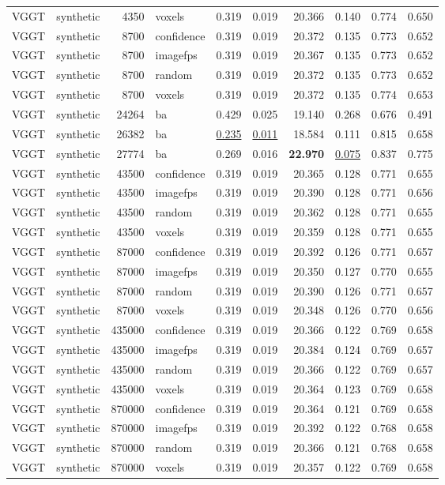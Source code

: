 \begin{table}[H]
\begin{tabular}{llrlrrrrrr}
VGGT & synthetic & 4350 & voxels & 0.319 & 0.019 & 20.366 & 0.140 & 0.774 & 0.650 \\
VGGT & synthetic & 8700 & confidence & 0.319 & 0.019 & 20.372 & 0.135 & 0.773 & 0.652 \\
VGGT & synthetic & 8700 & imagefps & 0.319 & 0.019 & 20.367 & 0.135 & 0.773 & 0.652 \\
VGGT & synthetic & 8700 & random & 0.319 & 0.019 & 20.372 & 0.135 & 0.773 & 0.652 \\
VGGT & synthetic & 8700 & voxels & 0.319 & 0.019 & 20.372 & 0.135 & 0.774 & 0.653 \\
VGGT & synthetic & 24264 & ba & 0.429 & 0.025 & 19.140 & 0.268 & 0.676 & 0.491 \\
VGGT & synthetic & 26382 & ba & \underline{0.235} & \underline{0.011} & 18.584 & 0.111 & 0.815 & 0.658 \\
VGGT & synthetic & 27774 & ba & 0.269 & 0.016 & \textbf{22.970} & \underline{0.075} & 0.837 & 0.775 \\
VGGT & synthetic & 43500 & confidence & 0.319 & 0.019 & 20.365 & 0.128 & 0.771 & 0.655 \\
VGGT & synthetic & 43500 & imagefps & 0.319 & 0.019 & 20.390 & 0.128 & 0.771 & 0.656 \\
VGGT & synthetic & 43500 & random & 0.319 & 0.019 & 20.362 & 0.128 & 0.771 & 0.655 \\
VGGT & synthetic & 43500 & voxels & 0.319 & 0.019 & 20.359 & 0.128 & 0.771 & 0.655 \\
VGGT & synthetic & 87000 & confidence & 0.319 & 0.019 & 20.392 & 0.126 & 0.771 & 0.657 \\
VGGT & synthetic & 87000 & imagefps & 0.319 & 0.019 & 20.350 & 0.127 & 0.770 & 0.655 \\
VGGT & synthetic & 87000 & random & 0.319 & 0.019 & 20.390 & 0.126 & 0.771 & 0.657 \\
VGGT & synthetic & 87000 & voxels & 0.319 & 0.019 & 20.348 & 0.126 & 0.770 & 0.656 \\
VGGT & synthetic & 435000 & confidence & 0.319 & 0.019 & 20.366 & 0.122 & 0.769 & 0.658 \\
VGGT & synthetic & 435000 & imagefps & 0.319 & 0.019 & 20.384 & 0.124 & 0.769 & 0.657 \\
VGGT & synthetic & 435000 & random & 0.319 & 0.019 & 20.366 & 0.122 & 0.769 & 0.657 \\
VGGT & synthetic & 435000 & voxels & 0.319 & 0.019 & 20.364 & 0.123 & 0.769 & 0.658 \\
VGGT & synthetic & 870000 & confidence & 0.319 & 0.019 & 20.364 & 0.121 & 0.769 & 0.658 \\
VGGT & synthetic & 870000 & imagefps & 0.319 & 0.019 & 20.392 & 0.122 & 0.768 & 0.658 \\
VGGT & synthetic & 870000 & random & 0.319 & 0.019 & 20.366 & 0.121 & 0.768 & 0.658 \\
VGGT & synthetic & 870000 & voxels & 0.319 & 0.019 & 20.357 & 0.122 & 0.769 & 0.658 \\
\bottomrule
\end{tabular}
\end{table}
